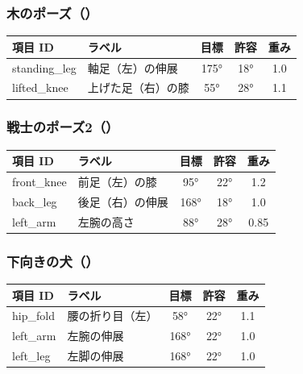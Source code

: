 \documentclass[a4paper,11pt]{ltjsarticle}
\begin{document}
\subsubsection{木のポーズ（）}

\begin{table}[h]
  \centering
  \small
  \begin{tabular}{@{}llccc@{}}
    \toprule
    項目 ID & ラベル & 目標 & 許容 & 重み \\
    \midrule
    standing\_leg & 軸足（左）の伸展 & 175° & 18° & 1.0 \\
    lifted\_knee & 上げた足（右）の膝 & 55° & 28° & 1.1 \\
    \bottomrule
  \end{tabular}
\end{table}

\subsubsection{戦士のポーズ2（）}

\begin{table}[h]
  \centering
  \small
  \begin{tabular}{@{}llccc@{}}
    \toprule
    項目 ID & ラベル & 目標 & 許容 & 重み \\
    \midrule
    front\_knee & 前足（左）の膝 & 95° & 22° & 1.2 \\
    back\_leg & 後足（右）の伸展 & 168° & 18° & 1.0 \\
    left\_arm & 左腕の高さ & 88° & 28° & 0.85 \\
    \bottomrule
  \end{tabular}
\end{table}

\subsubsection{下向きの犬（）}

\begin{table}[h]
  \centering
  \small
  \begin{tabular}{@{}llccc@{}}
    \toprule
    項目 ID & ラベル & 目標 & 許容 & 重み \\
    \midrule
    hip\_fold & 腰の折り目（左） & 58° & 22° & 1.1 \\
    left\_arm & 左腕の伸展 & 168° & 22° & 1.0 \\
    left\_leg & 左脚の伸展 & 168° & 22° & 1.0 \\
    \bottomrule
  \end{tabular}
\end{table}
\end{document}
